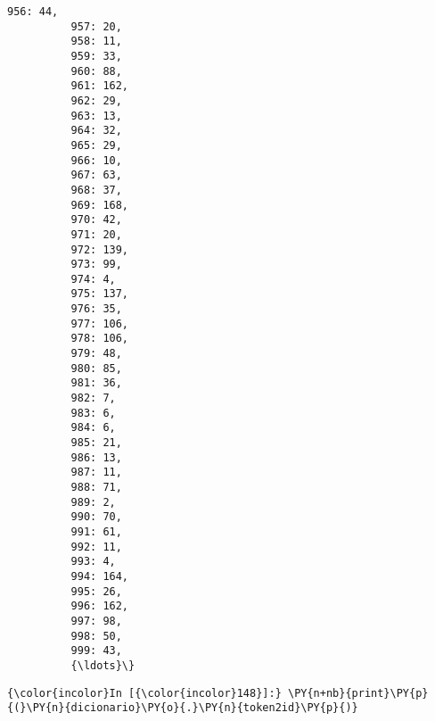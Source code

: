 \begin{Verbatim}[commandchars=\\\{\}]
          956: 44,
          957: 20,
          958: 11,
          959: 33,
          960: 88,
          961: 162,
          962: 29,
          963: 13,
          964: 32,
          965: 29,
          966: 10,
          967: 63,
          968: 37,
          969: 168,
          970: 42,
          971: 20,
          972: 139,
          973: 99,
          974: 4,
          975: 137,
          976: 35,
          977: 106,
          978: 106,
          979: 48,
          980: 85,
          981: 36,
          982: 7,
          983: 6,
          984: 6,
          985: 21,
          986: 13,
          987: 11,
          988: 71,
          989: 2,
          990: 70,
          991: 61,
          992: 11,
          993: 4,
          994: 164,
          995: 26,
          996: 162,
          997: 98,
          998: 50,
          999: 43,
          {\ldots}\}
\end{Verbatim}
        
    \begin{Verbatim}[commandchars=\\\{\}]
{\color{incolor}In [{\color{incolor}148}]:} \PY{n+nb}{print}\PY{p}{(}\PY{n}{dicionario}\PY{o}{.}\PY{n}{token2id}\PY{p}{)}
\end{Verbatim}

